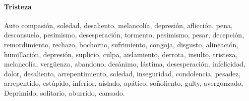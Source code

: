 \documentclass[../all.tex]{subfiles}
\begin{document}
    \paragraph{Tristeza}
    Auto compasión, soledad, desaliento, melancolía, depresión, aflicción, pena, desconsuelo, pesimismo, desesperación, tormento, pesimismo, pesar, decepción, remordimiento, rechazo, bochorno, sufrimiento, congoja, disgusto, alineación, humillación, depresión, suplicio, culpa, aislamiento, derrota, insulto, tristeza, melancolía, vergüenza, abandono, desánimo, lástima, desesperación, infelicidad, dolor, desaliento, arrepentimiento, soledad, inseguridad, condolencia, pesadez, arrepentido, estúpido, inferior, aislado, apático, soñoliento, gulty, avergonzado, Deprimido, solitario, aburrido, cansado.
\end{document}
